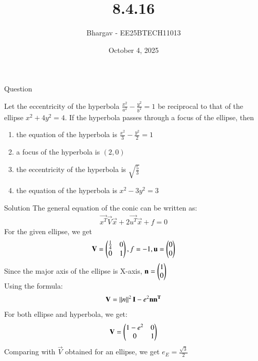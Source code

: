 \documentclass{beamer}
\title{8.4.16}
\date{October 4, 2025}
\author{Bhargav - EE25BTECH11013}
\begin{document}
\frame{\titlepage}

\begin{frame}{Question}

Let the eccentricity of the hyperbola $\frac{x^2}{a^2}-\frac{y^2}{b^2}=1$ be reciprocal to that of the ellipse $x^2+4y^2=4$. If the hyperbola
passes through a focus of the ellipse, then 

\begin{enumerate}
	\item the equation of the hyperbola is $\frac{x^2}{3}-\frac{y^2}{2}=1$
	\item a focus of the hyperbola is $(2,0)$
	\item the eccentricity of the hyperbola is $\sqrt{\frac{5}{3}}$
	\item the equation of the hyperbola is $x^2-3y^2=3$
\end{enumerate}
\end{frame}


\begin{frame}{Solution}
The general equation of the conic can be written as:
\begin{align}
\vec{x^T}\vec{V}\vec{x} + 2\vec{u^T}\vec{x} + f = 0
\end{align}
For the given ellipse, we get
\begin{align}
\mathbf{V} = \begin{pmatrix}\frac{1}{4} & 0 \\ 0 & 1\end{pmatrix}, f = -1, \mathbf{u} = \begin{pmatrix}0 \\ 0\end{pmatrix}
\end{align}
Since the major axis of the ellipse is X-axis, $\mathbf{n} = \begin{pmatrix}1 \\ 0\end{pmatrix}$ \\
Using the formula:
\begin{align}
\mathbf{V} = \left\lVert n\right\rVert^2\mathbf{I} - e^2\mathbf{n}\mathbf{n^T}
\end{align}
For both ellipse and hyperbola, we get:
\begin{align}
\mathbf{V} = \begin{pmatrix}1-e^2 & 0 \\ 0 & 1\end{pmatrix}
\end{align}
Comparing with $\vec{V}$ obtained for an ellipse, we get $e_E = \frac{\sqrt{3}}{2}$
\end{frame}
\end{document}
